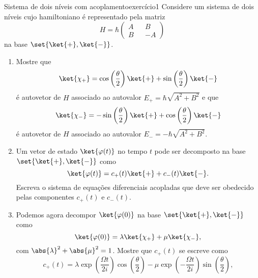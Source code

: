 \begin{exercício}{Sistema de dois níveis com acoplamento}{exercício1}
    Considere um sistema de dois níveis cujo hamiltoniano é representado pela matriz
    \begin{equation*}
        H = \hbar \begin{pmatrix}
            A && B\\
            B && -A
        \end{pmatrix}
    \end{equation*}
    na base \(\set{\ket{+}, \ket{-}}\).
    \begin{enumerate}[label=(\alph*)]
        \item Mostre que
            \begin{equation*}
                \ket{\chi_+} = \cos\left(\frac\theta2\right)\ket{+} + \sin\left(\frac\theta2\right)\ket{-}
            \end{equation*}
            é autovetor de \(H\) associado ao autovalor \(E_+ = \hbar\sqrt{A^2 + B^2}\) e que
            \begin{equation*}
                \ket{\chi_-} = -\sin\left(\frac\theta2\right)\ket{+} + \cos\left(\frac\theta2\right)\ket{-}
            \end{equation*}
            é autovetor de \(H\) associado ao autovalor \(E_- = -\hbar\sqrt{A^2 + B^2}\).
        \item Um vetor de estado \(\ket{\varphi(t)}\) no tempo \(t\) pode ser decomposto na base \(\set{\ket{+}, \ket{-}}\) como
            \begin{equation*}
                \ket{\varphi(t)} = c_+(t) \ket{+} + c_-(t) \ket{-}.
            \end{equation*}
            Escreva o sistema de equações diferenciais acopladas que deve ser obedecido pelas componentes \(c_+(t)\) e \(c_-(t)\).
        \item Podemos agora decompor \(\ket{\varphi(0)}\) na base \(\set{\ket{+}, \ket{-}}\) como
            \begin{equation*}
                \ket{\varphi(0)} = \lambda\ket{\chi_+} + \mu\ket{\chi_-},
            \end{equation*}
            com \(\abs{\lambda}^2 + \abs{\mu}^2 = 1\). Mostre que \(c_+(t)\) se escreve como
            \begin{equation*}
                c_+(t) = \lambda \exp\left(\frac{\Omega t}{2i}\right)\cos\left(\frac{\theta}{2}\right) -\mu \exp\left(-\frac{\Omega t}{2i}\right)\sin\left(\frac{\theta}{2}\right),
            \end{equation*}

\end{enumerate}
\end{exercício}
